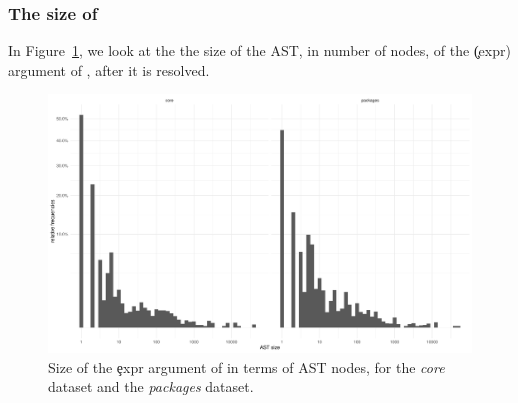 \documentclass[conference]{IEEEtran}
\begin{document}
\begin{table}[ht]
  \label{table:site-package-summary}
  \caption{Distribution of callsites across packages}
\end{table}


\subsubsection{The size of \eval}

In Figure~\ref{fig:ast-size}, we look at the the size of the AST, in number of nodes, of the \c(expr) argument of \eval, after it is resolved.


\begin{figure}[htbp]
	\includegraphics[width=\columnwidth]{ast_sizes}
	\caption{Size of the \c{expr} argument of \eval in terms of AST nodes, for the \emph{core} dataset and the \emph{packages} dataset.} \label{fig:ast-size}
\end{figure}
\end{document}
